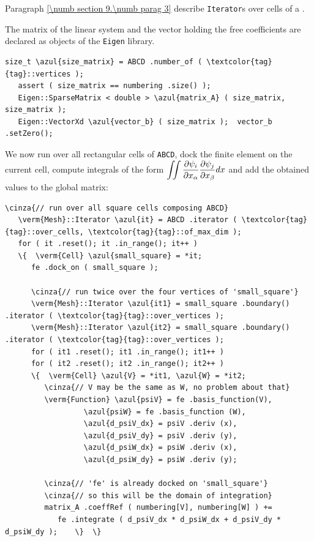 Paragraph \ref{\numb section 9.\numb parag 3} describe {\small\tt Iterator}s over
cells of a {\small\tt{}}.

The matrix of the linear system and the vector holding the free coefficients
are declared as objects of the {\small\tt Eigen} library.

\begin{Verbatim}[commandchars=\\\{\},formatcom=\small\tt,frame=single,
   label=parag-\ref{\numb section 6.\numb parag 3}.cpp,rulecolor=\color{moldura},
   baselinestretch=0.94,framesep=2mm                                            ]
   size_t \azul{size_matrix} = ABCD .number_of ( \textcolor{tag}{tag}::vertices );
   assert ( size_matrix == numbering .size() );
   Eigen::SparseMatrix < double > \azul{matrix_A} ( size_matrix, size_matrix );
   Eigen::VectorXd \azul{vector_b} ( size_matrix );  vector_b .setZero();
\end{Verbatim}

We now run over all rectangular cells of {\small\tt ABCD}, dock the finite element
on the current cell,
compute integrals of the form $ \displaystyle \int\!\!\!\int {\partial \psi_i \over
\partial x_\alpha} {\partial \psi_j \over \partial x_\beta} dx $ and add the obtained
values to the global matrix:

\begin{Verbatim}[commandchars=\\\{\},formatcom=\small\tt,frame=single,
   label=parag-\ref{\numb section 6.\numb parag 3}.cpp,rulecolor=\color{moldura},
   baselinestretch=0.94,framesep=2mm                                            ]
   \cinza{// run over all square cells composing ABCD}
   \verm{Mesh}::Iterator \azul{it} = ABCD .iterator ( \textcolor{tag}{tag}::over_cells, \textcolor{tag}{tag}::of_max_dim );
   for ( it .reset(); it .in_range(); it++ )
   \{  \verm{Cell} \azul{small_square} = *it;
      fe .dock_on ( small_square );

      \cinza{// run twice over the four vertices of 'small_square'}
      \verm{Mesh}::Iterator \azul{it1} = small_square .boundary() .iterator ( \textcolor{tag}{tag}::over_vertices );
      \verm{Mesh}::Iterator \azul{it2} = small_square .boundary() .iterator ( \textcolor{tag}{tag}::over_vertices );
      for ( it1 .reset(); it1 .in_range(); it1++ )
      for ( it2 .reset(); it2 .in_range(); it2++ )
      \{  \verm{Cell} \azul{V} = *it1, \azul{W} = *it2;
         \cinza{// V may be the same as W, no problem about that}
         \verm{Function} \azul{psiV} = fe .basis_function(V),
                  \azul{psiW} = fe .basis_function (W),
                  \azul{d_psiV_dx} = psiV .deriv (x),
                  \azul{d_psiV_dy} = psiV .deriv (y),
                  \azul{d_psiW_dx} = psiW .deriv (x),
                  \azul{d_psiW_dy} = psiW .deriv (y);
                  
         \cinza{// 'fe' is already docked on 'small_square'}
         \cinza{// so this will be the domain of integration}
         matrix_A .coeffRef ( numbering[V], numbering[W] ) +=
            fe .integrate ( d_psiV_dx * d_psiW_dx + d_psiV_dy * d_psiW_dy );    \}  \}
\end{Verbatim}

